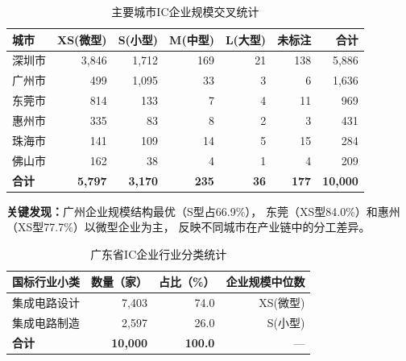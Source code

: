 \documentclass[12pt,a4paper]{ctexart}
\newcommand{\tableHeaderRow}{\rowcolor{tealPrimary}\color{white}}
\newcommand{\tableOddRow}{\rowcolor{mintBG}}
\newcommand{\tableEvenRow}{\rowcolor{white}}
\begin{document}
\begin{table}[H]
\centering
\caption{主要城市IC企业规模交叉统计}
\label{tab:city_scale}
\begin{tabular}{lrrrrrr}
\toprule
\tableHeaderRow
\textbf{城市} & \textbf{XS(微型)} & \textbf{S(小型)} & \textbf{M(中型)} & \textbf{L(大型)} & \textbf{未标注} & \textbf{合计} \\
\midrule
\tableOddRow  深圳市 & 3,846 & 1,712 & 169 & 21 & 138 & 5,886 \\
\tableEvenRow 广州市 & 499   & 1,095 & 33  & 3  & 6   & 1,636 \\
\tableOddRow  东莞市 & 814   & 133   & 7   & 4  & 11  & 969  \\
\tableEvenRow 惠州市 & 335   & 83    & 8   & 2  & 3   & 431  \\
\tableOddRow  珠海市 & 141   & 109   & 14  & 5  & 15  & 284  \\
\tableEvenRow 佛山市 & 162   & 38    & 4   & 1  & 4   & 209  \\
\midrule
\tableOddRow  \textbf{合计} & \textbf{5,797} & \textbf{3,170} & \textbf{235} & \textbf{36} & \textbf{177} & \textbf{10,000} \\
\bottomrule
\end{tabular}
\end{table}

\textbf{关键发现：}广州企业规模结构最优（S型占66.9\%），
东莞（XS型84.0\%）和惠州（XS型77.7\%）以微型企业为主，
反映不同城市在产业链中的分工差异。

\begin{table}[H]
\centering
\caption{广东省IC企业行业分类统计}
\label{tab:industry}
\begin{tabular}{lrrr}
\toprule
\tableHeaderRow
\textbf{国标行业小类} & \textbf{数量（家）} & \textbf{占比（\%）} & \textbf{企业规模中位数} \\
\midrule
\tableOddRow  集成电路设计 & 7,403 & 74.0 & XS(微型) \\
\tableEvenRow 集成电路制造 & 2,597 & 26.0 & S(小型)  \\
\midrule
\tableOddRow  \textbf{合计} & \textbf{10,000} & \textbf{100.0} & — \\
\bottomrule
\end{tabular}
\end{table}
\end{document}
